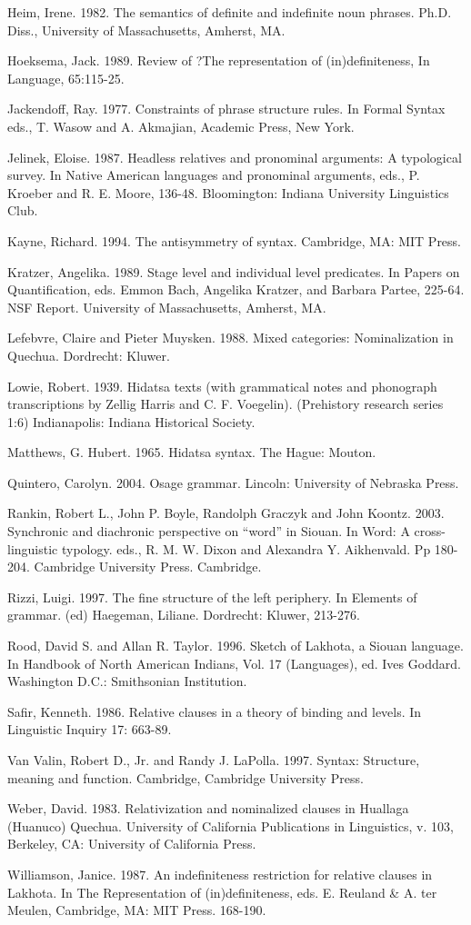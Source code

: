 \documentclass[output=paper]{LSP/langsci}
\begin{document}
\begin{reflist}
Heim, Irene. 1982. The semantics of definite and indefinite noun phrases. Ph.D. Diss., University of Massachusetts, Amherst, MA.

Hoeksema, Jack. 1989. Review of ?The representation of (in)definiteness, In Language, 65:115-25.

Jackendoff, Ray. 1977. Constraints of phrase structure rules. In Formal Syntax  eds., T. Wasow and A. Akmajian, Academic Press, New York.

Jelinek, Eloise. 1987. Headless relatives and pronominal arguments: A typological survey. In Native American languages and pronominal arguments, eds., P. Kroeber and R. E. Moore, 136-48. Bloomington: Indiana University Linguistics Club.

Kayne, Richard. 1994. The antisymmetry of syntax. Cambridge, MA: MIT Press. 

Kratzer, Angelika. 1989. Stage level and individual level predicates.  In Papers on Quantification, eds. Emmon Bach, Angelika Kratzer, and Barbara Partee, 225-64. NSF Report. University of Massachusetts, Amherst, MA.

Lefebvre, Claire and Pieter Muysken. 1988. Mixed categories: Nominalization in Quechua. Dordrecht: Kluwer.

Lowie, Robert. 1939. Hidatsa texts (with grammatical notes and phonograph transcriptions by Zellig Harris and C. F. Voegelin). (Prehistory research series 1:6) Indianapolis: Indiana Historical Society.

Matthews, G. Hubert. 1965. Hidatsa syntax. The Hague: Mouton.

Quintero, Carolyn. 2004. Osage grammar. Lincoln: University of Nebraska Press.

Rankin, Robert L., John P. Boyle, Randolph Graczyk and John Koontz. 2003. Synchronic and diachronic perspective on ``word'' in Siouan. In Word: A cross-linguistic typology. eds., R. M. W. Dixon and Alexandra Y. Aikhenvald. Pp 180-204. Cambridge University Press. Cambridge.

Rizzi, Luigi. 1997. The fine structure of the left periphery. In Elements of grammar. (ed) Haegeman, Liliane. Dordrecht: Kluwer, 213-276.

Rood, David S. and Allan R. Taylor. 1996.  Sketch of Lakhota, a Siouan language. In Handbook of North American Indians, Vol. 17 (Languages), ed. Ives Goddard. Washington D.C.: Smithsonian Institution.

Safir, Kenneth. 1986. Relative clauses in a theory of binding and levels.  In Linguistic Inquiry 17: 663-89.

Van Valin, Robert D., Jr. and Randy J. LaPolla. 1997. Syntax: Structure, meaning and function. Cambridge, Cambridge University Press.

Weber, David. 1983. Relativization and nominalized clauses in Huallaga (Huanuco) Quechua.  University of California Publications in Linguistics, v. 103, Berkeley, CA: University of California Press.

Williamson, Janice. 1987. An indefiniteness restriction for relative clauses in Lakhota. In The Representation of (in)definiteness, eds. E. Reuland \& A. ter Meulen, Cambridge, MA: MIT Press. 168-190.

\end{reflist}
\end{document}
